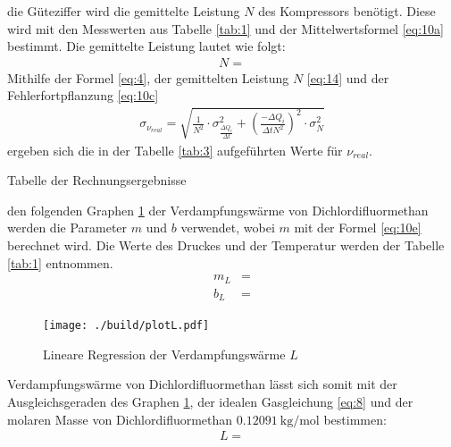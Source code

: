 \justifying die Güteziffer wird die gemittelte Leistung $N$ des Kompressors benötigt. Diese wird mit den Messwerten aus Tabelle
\ref{tab:1} und der Mittelwertsformel \eqref{eq:10a} bestimmt. Die gemittelte Leistung lautet wie folgt:
\begin{align}
    N = \text{} \label{eq:14}
\end{align}
Mithilfe der Formel \eqref{eq:4}, der gemittelten Leistung $N$ \eqref{eq:14} und der Fehlerfortpflanzung \eqref{eq:10c}
\begin{align}
    \sigma_{\nu_{real}} = \sqrt{\frac{1}{N^2} \cdot \sigma_{\frac{\Delta Q_i}{\Delta t}}^2 + \left( \frac{-\Delta Q_i}{\Delta t N^2} \right)^2 \cdot \sigma_{N}^2} \label{eq:15}
\end{align}
ergeben sich die in der Tabelle \ref{tab:3} aufgeführten Werte für $\nu_{real}$.

\begin{table}[H]
    \centering
    
    \caption{Tabelle der Rechnungsergebnisse}
    \label{tab:3}
\end{table}

\justifying den folgenden Graphen \ref{fig:4} der Verdampfungswärme von Dichlordifluormethan werden die Parameter $m$ und $b$ verwendet, wobei $m$ mit der
Formel \eqref{eq:10e} berechnet wird. Die Werte des Druckes und der Temperatur werden der Tabelle \ref{tab:1} entnommen. 
\begin{subequations}\label{eq:16}
\begin{align}
    m_L &= \text{}\label{eq:16a}\\
    b_L &= \text{}\label{eq:16b}
\end{align}
\end{subequations}

\begin{figure}[H]
    \centering
    \texttt{[image: ./build/plotL.pdf]}
    \caption{Lineare Regression der Verdampfungswärme $L$}
    \label{fig:4}
\end{figure}

\justifying Verdampfungswärme von Dichlordifluormethan lässt sich somit mit der Ausgleichsgeraden des Graphen \ref{fig:4}, 
der idealen Gasgleichung \eqref{eq:8} und der molaren Masse von Dichlordifluormethan $\SI{0.12091}{\kilo\gram\per\mole}$ \cite{Molmasse} bestimmen:
\begin{align}
    L = \text{}\label{eq:17}
\end{align}

